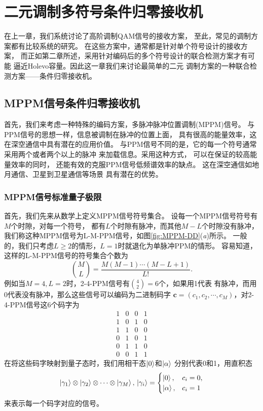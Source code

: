 \chapter{二元调制多符号条件归零接收机}
在上一章，我们系统讨论了高阶调制QAM信号的接收方案，
至此，常见的调制方案都有比较系统的研究。
在这些方案中，通常都是针对单个符号设计的接收方案，
而正如第二章所述，采用针对编码后的多个符号设计的联合检测方案才有可能
逼近Holevo容量。因此这一章我们来讨论最简单的二元
调制方案的一种联合检测方案——条件归零接收机。


\section{MPPM信号条件归零接收机}
首先，我们来考虑一种特殊的编码方案，多脉冲脉冲位置调制(MPPM)信号。
与PPM信号的思想一样，信息被调制在脉冲的位置上面，
具有很高的能量效率，这在深空通信中具有潜在的应用价值\cite{hemmati2006deep}。
与PPM信号不同的是，它的每一个符号通常采用两个或者两个以上的脉冲
来加载信息。采用这种方式，
可以在保证的较高能量效率的同时，
还能有效的克服PPM信号低频谱效率的缺点\cite{sugiyama1989mppm}。
这在深空通信如地月通信、卫星到卫星通信等场景
具有潜在的优势\cite{hemmati2006deep,waseda2011numerical}。

\subsection{MPPM信号标准量子极限}
首先，我们先来从数学上定义MPPM信号符号集合。
设每一个MPPM信号符号有$M$个时隙，对每一个符号，
都有$L$个时隙有脉冲，而其他$M-L$个时隙没有脉冲，
我们称这种MPPM信号为L-M-PPM信号，如图\ref{fig:MPPM-DD}(\textit{a})所示。
一般的，我们只考虑$L \ge 2$的情形，$L=1$时就退化为单脉冲PPM的情形。
容易知道，这样的L-M-PPM信号的符号集合个数为
\begin{equation}
\binom{M}{L} = \frac{M(M-1)\cdots(M-L+1)}{L!}.
\end{equation}
例如当$M=4, L=2$时，2-4-PPM信号有$\binom{4}{2}=6$个，如果用1代表
有脉冲，而用0代表没有脉冲，那么这些信号可以编码为二进制码字
$\bm{c} = (c_1, c_2, \cdots, c_M)$，对2-4-PPM信号这6个码字为
\begin{equation}
\begin{array}{cccc}
1 & 0 & 0 & 1 \\
1 & 0 & 1 & 0 \\
1 & 1 & 0 & 0 \\
0 & 1 & 0 & 1 \\
0 & 1 & 1 & 0 \\
0 & 0 & 1 & 1   
\end{array}
\end{equation}
在将这些码字映射到量子态时，我们用相干态$\ket{0}$和$\ket{\alpha}$
分别代表0和1，用直积态
\begin{equation}
\ket{\gamma_1}\otimes\ket{\gamma_2}\otimes\cdots\otimes\ket{\gamma_M}, \\
\ket{\gamma_i} = \begin{cases}
                    \ket{0}, & c_i=0, \\
                    \ket{\alpha}, & c_i=1
                \end{cases}
\end{equation}
来表示每一个码字对应的信号。

